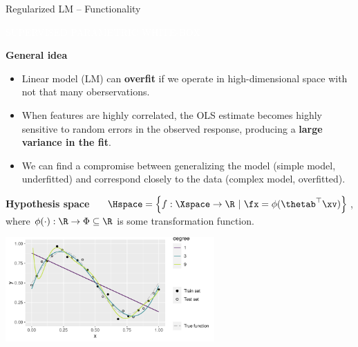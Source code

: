 \documentclass[11pt,compress,t,notes=noshow, xcolor=table]{beamer}
\newcommand{\maketag}[1]{\colorbox{highlightcol}{\textcolor{white}
{\MakeUppercase{#1}}}}
\newcommand{\highlight}[1]{\textcolor{highlightcol}{\textbf{#1}}}
\begin{document}
\begin{frame}{Regularized LM -- Functionality}

\footnotesize

\maketag{SUPERVISED}
\maketag{PARAMETRIC}
\maketag{WHITE-BOX}

\medskip

\highlight{General idea} ~~
\begin{itemize}

\item Linear model (LM) can \textbf{overfit} if we operate in high-dimensional space with not that many oberservations.

\item When features are highly correlated, the OLS estimate becomes highly sensitive to random errors in the observed response, producing a \textbf{large variance in the fit}.

\item We can find a compromise between generalizing the model (simple model, underfitted) and correspond closely to the data (complex model, overfitted).

\end{itemize}

\medskip

\highlight{Hypothesis space} ~~
$\Hspace = \left\{f: \Xspace \to \R ~|~\fx = \phi(\thetab^\top \xv)\right\}$, 
where $\phi(\cdot): \R \to \Phi \subseteq \R$ is some transformation function.



\medskip
\centering
  \includegraphics[width=0.6\textwidth]{figure/reg_lm_overfitting.pdf}

\end{frame}
\end{document}

